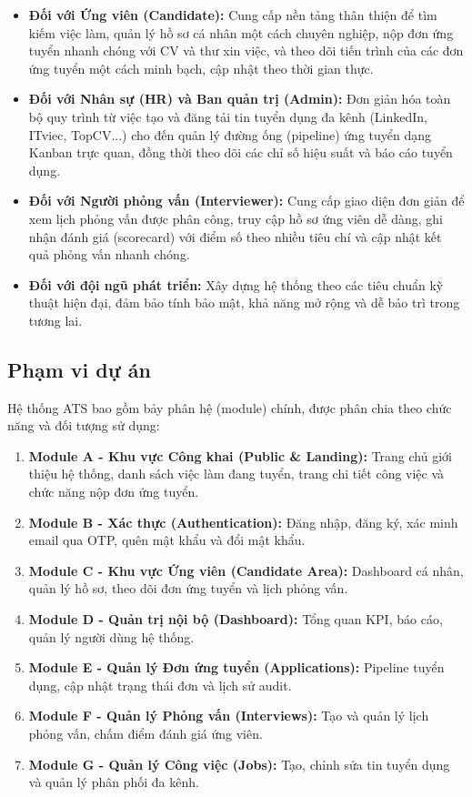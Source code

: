 \begin{itemize}
    \item \textbf{Đối với Ứng viên (Candidate):} Cung cấp nền tảng thân thiện để tìm kiếm việc làm, quản lý hồ sơ cá nhân một cách chuyên nghiệp, nộp đơn ứng tuyển nhanh chóng với CV và thư xin việc, và theo dõi tiến trình của các đơn ứng tuyển một cách minh bạch, cập nhật theo thời gian thực.
    \item \textbf{Đối với Nhân sự (HR) và Ban quản trị (Admin):} Đơn giản hóa toàn bộ quy trình từ việc tạo và đăng tải tin tuyển dụng đa kênh (LinkedIn, ITviec, TopCV...) cho đến quản lý đường ống (pipeline) ứng tuyển dạng Kanban trực quan, đồng thời theo dõi các chỉ số hiệu suất và báo cáo tuyển dụng.
    \item \textbf{Đối với Người phỏng vấn (Interviewer):} Cung cấp giao diện đơn giản để xem lịch phỏng vấn được phân công, truy cập hồ sơ ứng viên dễ dàng, ghi nhận đánh giá (scorecard) với điểm số theo nhiều tiêu chí và cập nhật kết quả phỏng vấn nhanh chóng.
    \item \textbf{Đối với đội ngũ phát triển:} Xây dựng hệ thống theo các tiêu chuẩn kỹ thuật hiện đại, đảm bảo tính bảo mật, khả năng mở rộng và dễ bảo trì trong tương lai.
\end{itemize}

\subsection{Phạm vi dự án}
Hệ thống ATS bao gồm bảy phân hệ (module) chính, được phân chia theo chức năng và đối tượng sử dụng:

\begin{enumerate}
    \item \textbf{Module A - Khu vực Công khai (Public \& Landing):} Trang chủ giới thiệu hệ thống, danh sách việc làm đang tuyển, trang chi tiết công việc và chức năng nộp đơn ứng tuyển.
    \item \textbf{Module B - Xác thực (Authentication):} Đăng nhập, đăng ký, xác minh email qua OTP, quên mật khẩu và đổi mật khẩu.
    \item \textbf{Module C - Khu vực Ứng viên (Candidate Area):} Dashboard cá nhân, quản lý hồ sơ, theo dõi đơn ứng tuyển và lịch phỏng vấn.
    \item \textbf{Module D - Quản trị nội bộ (Dashboard):} Tổng quan KPI, báo cáo, quản lý người dùng hệ thống.
    \item \textbf{Module E - Quản lý Đơn ứng tuyển (Applications):} Pipeline tuyển dụng, cập nhật trạng thái đơn và lịch sử audit.
    \item \textbf{Module F - Quản lý Phỏng vấn (Interviews):} Tạo và quản lý lịch phỏng vấn, chấm điểm đánh giá ứng viên.
    \item \textbf{Module G - Quản lý Công việc (Jobs):} Tạo, chỉnh sửa tin tuyển dụng và quản lý phân phối đa kênh.
\end{enumerate}

